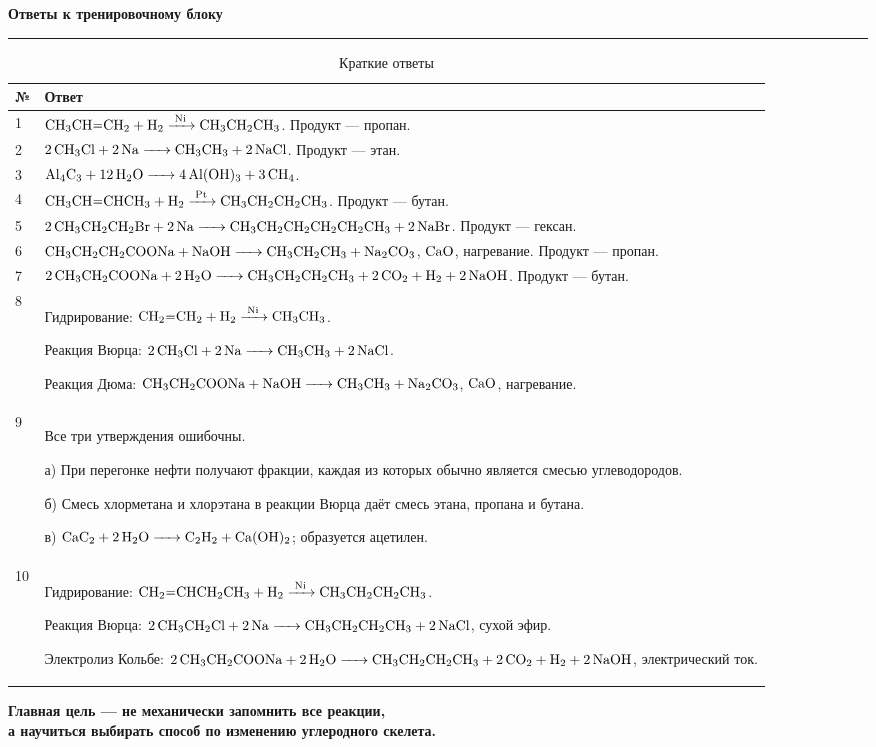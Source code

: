 \documentclass[a4paper,12pt]{article}
\newcommand{\sectiontitle}[1]{%
    \vspace{0.9em}%
    {\Large\bfseries\color{darkaccent}#1\par}%
    \vspace{0.2em}%
    {\color{accent}\rule{\linewidth}{0.8pt}}%
    \vspace{0.45em}%
}
\begin{document}
\clearpage
\sectiontitle{Ответы к тренировочному блоку}

\renewcommand{\arraystretch}{1.4}

\begin{table}[ht]
\centering
\caption{Краткие ответы}
\small
\begin{tabularx}{\linewidth}{@{}p{1.1cm}Y@{}}
\toprule
\textbf{№} & \textbf{Ответ} \\
\midrule

1 &
\(\ce{CH3CH=CH2 + H2 ->[Ni] CH3CH2CH3}\).
Продукт --- пропан.
\\

2 &
\(\ce{2CH3Cl + 2Na -> CH3CH3 + 2NaCl}\).
Продукт --- этан.
\\

3 &
\(\ce{Al4C3 + 12H2O -> 4Al(OH)3 + 3CH4}\).
\\

4 &
\(\ce{CH3CH=CHCH3 + H2 ->[Pt] CH3CH2CH2CH3}\).
Продукт --- бутан.
\\

5 &
\(\ce{2CH3CH2CH2Br + 2Na ->
CH3CH2CH2CH2CH2CH3 + 2NaBr}\).
Продукт --- гексан.
\\

6 &
\(\ce{CH3CH2CH2COONa + NaOH ->
CH3CH2CH3 + Na2CO3}\),
\(\ce{CaO}\), нагревание.
Продукт --- пропан.
\\

7 &
\(\ce{2CH3CH2COONa + 2H2O ->
CH3CH2CH2CH3 + 2CO2 + H2 + 2NaOH}\).
Продукт --- бутан.
\\

8 &
Гидрирование:
\(\ce{CH2=CH2 + H2 ->[Ni] CH3CH3}\).

Реакция Вюрца:
\(\ce{2CH3Cl + 2Na -> CH3CH3 + 2NaCl}\).

Реакция Дюма:
\(\ce{CH3CH2COONa + NaOH ->
CH3CH3 + Na2CO3}\),
\(\ce{CaO}\), нагревание.
\\

9 &
Все три утверждения ошибочны.

а) При перегонке нефти получают фракции, каждая из которых обычно является
смесью углеводородов.

б) Смесь хлорметана и хлорэтана в реакции Вюрца даёт смесь этана,
пропана и бутана.

в) \(\ce{CaC2 + 2H2O -> C2H2 + Ca(OH)2}\);
образуется ацетилен.
\\

10 &
Гидрирование:
\(\ce{CH2=CHCH2CH3 + H2 ->[Ni] CH3CH2CH2CH3}\).

Реакция Вюрца:
\(\ce{2CH3CH2Cl + 2Na ->
CH3CH2CH2CH3 + 2NaCl}\), сухой эфир.

Электролиз Кольбе:
\(\ce{2CH3CH2COONa + 2H2O ->
CH3CH2CH2CH3 + 2CO2 + H2 + 2NaOH}\),
электрический ток.
\\

\bottomrule
\end{tabularx}
\end{table}

\vfill

\begin{center}
    {\color{darkaccent}\bfseries
        Главная цель --- не механически запомнить все реакции,\\
        а научиться выбирать способ по изменению углеродного скелета.
    }
\end{center}
\end{document}
